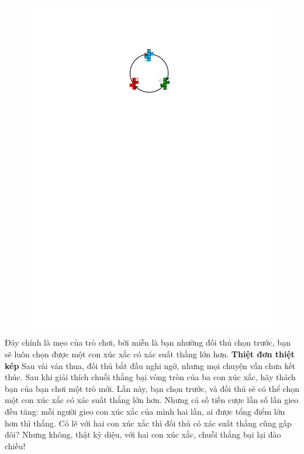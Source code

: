 \begin{multicols}{2}
\begin{figure}[H]
		\includegraphics[scale =0.9]{4}
		\vspace*{-15pt}
	\end{figure}
	Đây chính là mẹo của trò chơi, bởi miễn là bạn nhường đối thủ chọn trước, bạn sẽ luôn chọn được một con xúc xắc có xác suất thắng lớn hơn.
	\vskip 0.05cm
	\textbf{\color{quantoan}Thiệt đơn thiệt kép}
	\vskip 0.05cm
	Sau vài ván thua, đối thủ bắt đầu nghi ngờ, nhưng mọi chuyện vẫn chưa kết thúc. Sau khi giải thích chuỗi thắng bại vòng tròn của ba con xúc xắc, hãy thách bạn của bạn chơi một trò mới.
	\vskip 0.05cm
	Lần này, bạn chọn trước, và đối thủ sẽ có thể chọn một con xúc xắc có xác suất thắng lớn hơn. Nhưng cả số tiền cược lẫn số lần gieo đều tăng: mỗi người gieo con xúc xắc của mình hai lần, ai được tổng điểm lớn hơn thì thắng.
	\vskip 0.05cm
	Có lẽ với hai con xúc xắc thì đối thủ có xác suất thắng cũng gấp đôi? Nhưng không, thật kỳ diệu, với hai con xúc xắc, chuỗi thắng bại lại đảo chiều!
	\begin{figure}[H]
		\vspace*{-10pt}

\end{figure}
\end{multicols}
